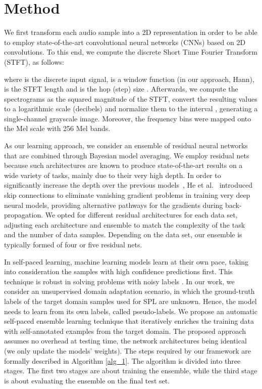\documentclass[a4paper]{article}
\begin{document}
\section{Method}



We first transform each audio sample into a 2D representation in order to be able to employ state-of-the-art convolutional neural networks (CNNs) \cite{He-CVPR-2016,Krizhevsky-NIPS-2012} based on 2D convolutions. To this end, we compute the discrete Short Time Fourier Transform (STFT), as follows:

where  is the discrete input signal,  is a window function (in our approach, Hann),  is the STFT length and  is the hop (step) size \cite{Allen-IEEE-1977}. Afterwards, we compute the spectrograms as the squared magnitude of the STFT, convert the resulting values to a logarithmic scale (decibels) and normalize them to the interval , generating a single-channel grayscale image. Moreover, the frequency bins were mapped onto the Mel scale with 256 Mel bands.

As our learning approach, we consider an ensemble of residual neural networks \cite{He-CVPR-2016,zhang2020resnest} that are combined through Bayesian model averaging. We employ residual nets because such architectures are known to produce state-of-the-art results on a wide variety of tasks, mainly due to their very high depth. In order to significantly increase the depth over the previous models~\cite{Krizhevsky-NIPS-2012,Simonyan-ICLR-2014}, He et al.~\cite{He-CVPR-2016} introduced skip connections to eliminate vanishing gradient problems in training very deep neural models, providing alternative pathways for the gradients during back-propagation. We opted for different residual architectures for each data set, adjusting each architecture and ensemble to match the complexity of the task and the number of data samples. Depending on the data set, our ensemble is typically formed of four or five residual nets.

In self-paced learning, machine learning models learn at their own pace, taking into consideration the samples with high confidence predictions first. This technique is robust in solving problems with noisy labels \cite{meng2017theoretical}. In our work, we consider an unsupervised domain adaptation scenario, in which the ground-truth labels of the target domain samples used for SPL are unknown. Hence, the model needs to learn from its own labels, called pseudo-labels. We propose an automatic self-paced ensemble learning technique that iteratively enriches the training data with self-annotated examples from the target domain. The proposed approach assumes no overhead at testing time, the network architectures being identical (we only update the models' weights). The steps required by our framework are formally described in Algorithm \ref{alg_1}. The algorithm is divided into three stages. The first two stages are about training the ensemble, while the third stage is about evaluating the ensemble on the final test set.
\end{document}
